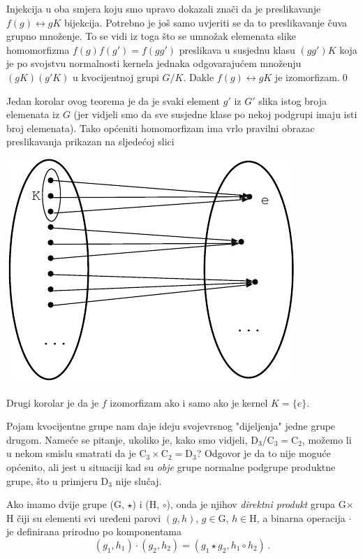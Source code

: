 Injekcija u oba smjera koju smo upravo dokazali znači da je
preslikavanje $f(g)\leftrightarrow gK$ bijekcija. Potrebno je još samo
uvjeriti se da to preslikavanje čuva grupno množenje. To se vidi iz toga
što se umnožak elemenata slike homomorfizma $f(g)f(g')=f(gg')$ preslikava
u susjednu klasu $(gg')K$ koja je po svojstvu normalnosti kernela jednaka
odgovarajućem množenju $(gK)(g'K)$ u kvocijentnoj grupi $G/K$.
Dakle $f(g)\leftrightarrow gK$ je izomorfizam.\qed
  


Jedan korolar ovog teorema je da je svaki element $g'$ iz $G'$ slika
istog broja elemenata iz $G$ (jer vidjeli smo da sve susjedne klase po
nekoj podgrupi imaju isti broj elemenata). Tako općeniti homomorfizam
ima vrlo pravilni obrazac preslikavanja prikazan na sljedećoj slici\\[2ex]
\vspace*{4ex}
\centerline{\includegraphics[scale=1.0]{pics/homo3}}
Drugi korolar je da je $f$ izomorfizam ako i
samo ako je kernel $K=\{e\}$.

Pojam kvocijentne grupe nam daje ideju svojevrsnog "dijeljenja" jedne
grupe drugom.
Nameće se pitanje, ukoliko je, kako smo vidjeli, 
$\mathrm{D}_{3}$/$\mathrm{C}_3 = \mathrm{C}_2$, možemo li u nekom smislu
smatrati da je $\mathrm{C}_3 \times \mathrm{C}_2 = \mathrm{D}_3$?
Odgovor je da to nije moguće općenito, ali jest u situaciji kad su
\emph{obje} grupe normalne podgrupe produktne grupe, što u primjeru
$\mathrm{D}_3$ nije slučaj.

\begin{definicija}\label{def:direktniproduktgrupa}
Ako imamo dvije grupe (G, $\star$) i (H, $\circ$), onda je njihov
\emph{direktni produkt} grupa G$\times$H čiji su elementi svi uređeni
parovi $(g, h)$, $g \in \mathrm{G}$, $h \in \mathrm{H}$, a 
binarna operacija $\cdot$ je definirana prirodno po komponentama
\begin{equation}
    (g_1, h_1) \cdot (g_2, h_2) = (g_1 \star g_2, h_1 \circ h_2) \,.
    \label{eq:Gproduct}
\end{equation}
\end{definicija}

